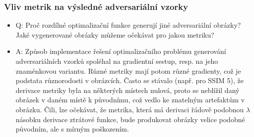 \documentclass[czech]{beamer}
\begin{document}
\begin{frame}
    \frametitle{Vliv metrik na výsledné adversariální vzorky}

    \begin{itemize}
        \item Q: Proč rozdílné optimalizační funkce generují jiné adversariální obrázky? Jaké vygenerované
        obrázky můžeme očekávat pro jakou metriku?
        \item A: Způsob implementace řešení optimalizačního problému generování adversariálních vzorků
        spoléhal na gradientní sestup, resp. na jeho znaménkovou variantu. Různé metriky mají potom různé gradienty,
        což je podstata různorodosti v obrázcích.
        Často se stávalo (např. pro SSIM 5), že derivace metriky byla na některých místech nulová,
        proto se neblížil daný obrázek v daném místě k původnímu, což vedlo ke znatelným artefaktům v obrázku.
        Čili, lze očekávat, že metrika, která má derivaci řádově podobnou $\lambda$ násobku derivace ztrátové funkce,
        bude produkovat obrázky velice podobné původním, ale s mírným poškozením.
    \end{itemize}

\end{frame}
\end{document}
